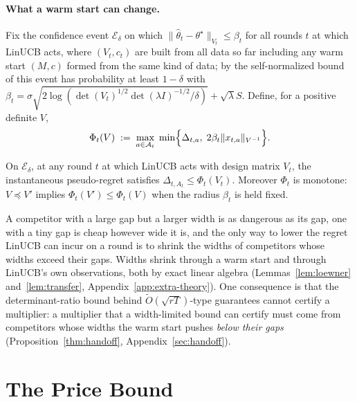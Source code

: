 \documentclass[anon]{alt2027} %
\begin{document}
\paragraph{What a warm start can change.}
\label{sec:width}
Fix the confidence event $\mathcal E_\delta$ on which
$\|\widehat\theta_t-\theta^\star\|_{V_t}\le\beta_t$ for all rounds $t$ at
which LinUCB acts, where $(V_t,c_t)$ are built from all data so far including
any warm start $(M,c)$ formed from the same kind of data; by the
self-normalized bound of \citet{abbasi2011improved} this event has probability
at least $1-\delta$ with
$\beta_t=\sigma\sqrt{2\log(\det(V_t)^{1/2}\det(\lambda I)^{-1/2}/\delta)}+\sqrt\lambda S$.
Define, for a positive definite $V$,
\begin{equation}
\label{eq:phi}
\Phi_t(V)\;:=\;\max_{a\in\mathcal A_t}\;\min\Bigl\{\Delta_{t,a},\;2\beta_t\|x_{t,a}\|_{V^{-1}}\Bigr\}.
\end{equation}

\begin{lemma}
\label{lem:width-limited}
On $\mathcal E_\delta$, at any round $t$ at which LinUCB acts with design
matrix $V_t$, the instantaneous pseudo-regret satisfies
$\Delta_{t,A_t}\le\Phi_t(V_t)$. Moreover $\Phi_t$ is monotone: $V\preceq V'$
implies $\Phi_t(V')\le\Phi_t(V)$ when the radius $\beta_t$ is held fixed.
\end{lemma}

A competitor with a large gap but a larger width is as dangerous as its gap,
one with a tiny gap is cheap however wide it is, and the only way to lower the
regret LinUCB can incur on a round is to shrink the widths of competitors
whose widths exceed their gaps. Widths shrink through a warm start and through
LinUCB's own observations, both by exact linear algebra
(Lemmas~\ref{lem:loewner} and~\ref{lem:transfer},
Appendix~\ref{app:extra-theory}). One consequence is that the
determinant-ratio bound behind $\widetilde O(\sqrt{rT})$-type guarantees
cannot certify a multiplier: a multiplier that a width-limited bound can
certify must come from competitors whose widths the warm start pushes
\emph{below their gaps}
(Proposition~\ref{thm:handoff}, Appendix~\ref{sec:handoff}).

\section{The Price Bound}
\label{sec:price}
\end{document}
